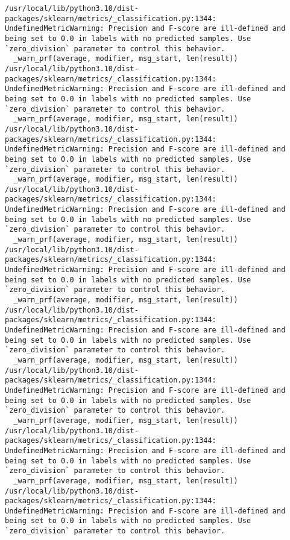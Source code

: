 \documentclass[
  letterpaper,
]{krantz}
\begin{document}
\begin{verbatim}
/usr/local/lib/python3.10/dist-packages/sklearn/metrics/_classification.py:1344: UndefinedMetricWarning: Precision and F-score are ill-defined and being set to 0.0 in labels with no predicted samples. Use `zero_division` parameter to control this behavior.
  _warn_prf(average, modifier, msg_start, len(result))
/usr/local/lib/python3.10/dist-packages/sklearn/metrics/_classification.py:1344: UndefinedMetricWarning: Precision and F-score are ill-defined and being set to 0.0 in labels with no predicted samples. Use `zero_division` parameter to control this behavior.
  _warn_prf(average, modifier, msg_start, len(result))
/usr/local/lib/python3.10/dist-packages/sklearn/metrics/_classification.py:1344: UndefinedMetricWarning: Precision and F-score are ill-defined and being set to 0.0 in labels with no predicted samples. Use `zero_division` parameter to control this behavior.
  _warn_prf(average, modifier, msg_start, len(result))
/usr/local/lib/python3.10/dist-packages/sklearn/metrics/_classification.py:1344: UndefinedMetricWarning: Precision and F-score are ill-defined and being set to 0.0 in labels with no predicted samples. Use `zero_division` parameter to control this behavior.
  _warn_prf(average, modifier, msg_start, len(result))
/usr/local/lib/python3.10/dist-packages/sklearn/metrics/_classification.py:1344: UndefinedMetricWarning: Precision and F-score are ill-defined and being set to 0.0 in labels with no predicted samples. Use `zero_division` parameter to control this behavior.
  _warn_prf(average, modifier, msg_start, len(result))
/usr/local/lib/python3.10/dist-packages/sklearn/metrics/_classification.py:1344: UndefinedMetricWarning: Precision and F-score are ill-defined and being set to 0.0 in labels with no predicted samples. Use `zero_division` parameter to control this behavior.
  _warn_prf(average, modifier, msg_start, len(result))
/usr/local/lib/python3.10/dist-packages/sklearn/metrics/_classification.py:1344: UndefinedMetricWarning: Precision and F-score are ill-defined and being set to 0.0 in labels with no predicted samples. Use `zero_division` parameter to control this behavior.
  _warn_prf(average, modifier, msg_start, len(result))
/usr/local/lib/python3.10/dist-packages/sklearn/metrics/_classification.py:1344: UndefinedMetricWarning: Precision and F-score are ill-defined and being set to 0.0 in labels with no predicted samples. Use `zero_division` parameter to control this behavior.
  _warn_prf(average, modifier, msg_start, len(result))
/usr/local/lib/python3.10/dist-packages/sklearn/metrics/_classification.py:1344: UndefinedMetricWarning: Precision and F-score are ill-defined and being set to 0.0 in labels with no predicted samples. Use `zero_division` parameter to control this behavior.

\end{verbatim}
\end{document}
